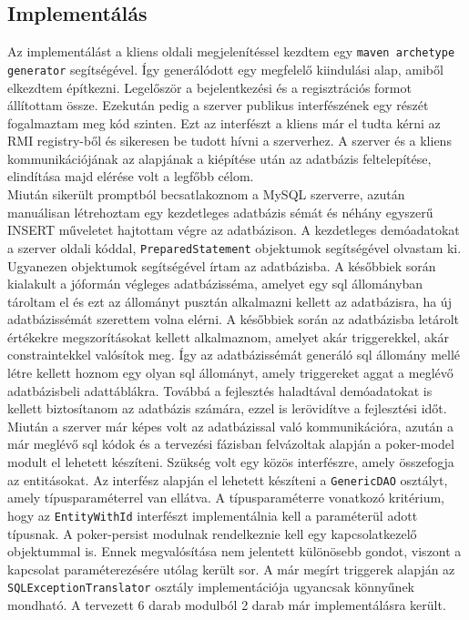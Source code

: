 \subsection{Implementálás}
Az implementálást a kliens oldali megjelenítéssel kezdtem egy \texttt{maven archetype generator} segítségével. Így generálódott egy megfelelő kiindulási alap, amiből elkezdtem építkezni. Legelőször a bejelentkezési és a regisztrációs formot állítottam össze. Ezekután pedig a szerver publikus interfészének egy részét fogalmaztam meg kód szinten. Ezt az interfészt a kliens már el tudta kérni az RMI registry-ből \cite{RMI} és sikeresen be tudott hívni a szerverhez. A szerver és a kliens kommunikációjának az alapjának a kiépítése után az adatbázis feltelepítése, elindítása majd elérése volt a legfőbb célom. \\
Miután sikerült promptból becsatlakoznom a MySQL szerverre, azután manuálisan létrehoztam egy kezdetleges adatbázis sémát és néhány egyszerű INSERT műveletet hajtottam végre az adatbázison. A kezdetleges demóadatokat a szerver oldali kóddal, \texttt{PreparedStatement} objektumok segítségével olvastam ki. Ugyanezen objektumok segítségével írtam az adatbázisba. A későbbiek során kialakult a jóformán végleges adatbázisséma, amelyet egy sql állományban tároltam el és ezt az állományt pusztán alkalmazni kellett az adatbázisra, ha új adatbázissémát szerettem volna elérni. A későbbiek során az adatbázisba letárolt értékekre megszorításokat kellett alkalmaznom, amelyet akár triggerekkel, akár constraintekkel valósítok meg. Így az adatbázissémát generáló sql állomány mellé létre kellett hoznom egy olyan sql állományt, amely triggereket aggat a meglévő adatbázisbeli adattáblákra. Továbbá a fejlesztés haladtával demóadatokat is kellett biztosítanom az adatbázis számára, ezzel is lerövidítve a fejlesztési időt. \\
Miután a szerver már képes volt az adatbázissal való kommunikációra, azután a már meglévő sql kódok és a tervezési fázisban felvázoltak alapján a poker-model modult el lehetett készíteni. Szükség volt egy közös interfészre, amely összefogja az entitásokat. Az interfész alapján el lehetett készíteni a \texttt{GenericDAO} osztályt, amely típusparaméterrel van ellátva. A típusparaméterre vonatkozó kritérium, hogy az \texttt{EntityWithId} interfészt implementálnia kell a paraméterül adott típusnak. A poker-persist modulnak rendelkeznie kell egy kapcsolatkezelő objektummal is. Ennek megvalósítása nem jelentett különösebb gondot, viszont a kapcsolat paraméterezésére utólag került sor. A már megírt triggerek alapján az \texttt{SQLExceptionTranslator} osztály implementációja ugyancsak könnyűnek mondható. A tervezett 6 darab modulból 2 darab már implementálásra került. \\
